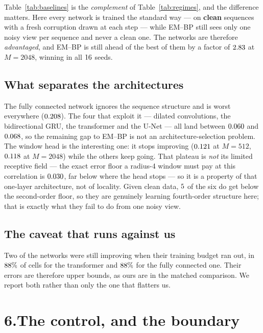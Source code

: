 \documentclass[10pt,a4paper]{article}
\newcommand{\nseq}{M}
\begin{document}
\noindent
Table~\ref{tab:baselines} is the \emph{complement} of Table~\ref{tab:regimes}, and the difference matters. Here every
network is trained the standard way --- on \textbf{clean} sequences with a fresh corruption drawn
at each step --- while EM--BP still sees only one noisy view per sequence and never a clean one.
The networks are therefore \emph{advantaged}, and EM--BP is still ahead of the best of them by a
factor of $2.83$ at $\nseq=2048$, winning in all $16$ seeds.

\subsection{What separates the architectures} The fully connected network ignores the sequence
structure and is worst everywhere ($0.208$). The four that exploit it --- dilated
convolutions, the bidirectional GRU, the transformer and the U-Net --- all land between
$0.060$ and $0.068$, so the remaining gap to EM--BP is not an
architecture-selection problem. The window head is the interesting one: it stops improving
($0.121$ at $\nseq=512$, $0.118$ at $\nseq=2048$) while the others keep going. That
plateau is \emph{not} its limited receptive field --- the exact error floor a radius-4 window must
pay at this correlation is $0.030$, far below where the head stops ---
so it is a property of that one-layer architecture, not of locality. Given clean data,
$5$ of the six do get below the second-order floor, so they are genuinely learning
fourth-order structure here; that is exactly what they fail to do from one noisy view.

\subsection{The caveat that runs against us} Two of the networks were still improving when their
training budget ran out, in $88\%$ of cells for the transformer and
$88\%$ for the fully connected one. Their errors are therefore upper bounds, as ours
are in the matched comparison. We report both rather than only the one that flatters us.

\section*{6.\quad The control, and the boundary}
\end{document}
